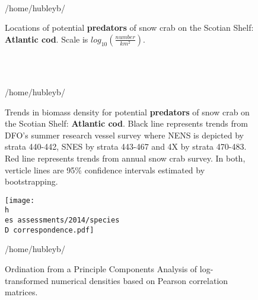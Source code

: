 \documentclass[11pt]{article}
\newcommand{\D}{.}
\newcommand{\h}{/home/hubleyb/}
\newcommand{\es}{bio.data/bio.snowcrab/}
\begin{document}
\clearpage



\begin{figure}
\centering
{}\ 
\ 
\\ 

\caption{Locations of potential \textbf{predators} of snow crab on the Scotian Shelf: \textbf{Atlantic cod}. Scale is $log_{10} \left(\tfrac{number}{km^2}\right)$.}
\h \end{figure}

\begin{figure}
\centering
{}\ 
\\ 
\ 

\caption{Trends in biomass density for potential \textbf{predators} of snow crab on the Scotian Shelf: \textbf{Atlantic cod}. Black line represents trends from DFO's summer research vessel survey where NENS is depicted by strata 440-442, SNES by strata 443-467 and 4X by strata 470-483. Red line represents trends from annual snow crab survey.  In both, verticle lines are 95\% confidence intervals estimated by bootstrapping. }
\h \end{figure}


\clearpage




\begin{figure}
\centering
\texttt{[image: \\h \\es assessments/2014/species\\D correspondence.pdf]}
\caption{Ordination from a Principle Components Analysis of log-transformed numerical densities based on Pearson correlation matrices.}
\h \end{figure}
\clearpage
\end{document}
